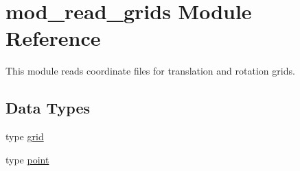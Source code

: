 \hypertarget{namespacemod__read__grids}{}\section{mod\+\_\+read\+\_\+grids Module Reference}
\label{namespacemod__read__grids}


This module reads coordinate files for translation and rotation grids.  


\subsection*{Data Types}
\begin{DoxyCompactItemize}
\item 
type \hyperlink{structmod__read__grids_1_1grid}{grid}
\item 
type \hyperlink{structmod__read__grids_1_1point}{point}
\end{DoxyCompactItemize}
